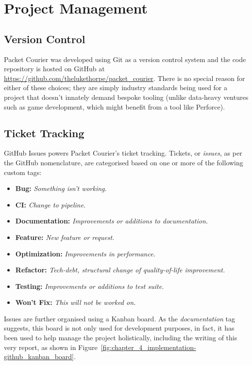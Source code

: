 \section{Project Management}

\subsection{Version Control}

Packet Courier was developed using Git\cite{git} as a version control system and the code repository is hosted on
GitHub\cite{github, packet_courier} at \url{https://github.com/thelukethorpe/packet_courier}. There is no special
reason for either of these choices; they are simply industry standards being used for a project that doesn't
innately demand bespoke tooling (unlike data-heavy ventures such as game development, which might benefit from a tool
like Perforce\cite{perforce, perforce_vs_git}).

\subsection{Ticket Tracking}

GitHub Issues\cite{github_issues} powers Packet Courier's ticket tracking. Tickets, or \emph{issues}, as per the
GitHub nomenclature, are categorised based on one or more of the following custom tags:
\begin{itemize}
    \item \textbf{Bug:} \emph{Something isn't working.}
    \item \textbf{CI:} \emph{Change to pipeline.}
    \item \textbf{Documentation:} \emph{Improvements or additions to documentation.}
    \item \textbf{Feature:} \emph{New feature or request.}
    \item \textbf{Optimization:} \emph{Improvements in performance.}
    \item \textbf{Refactor:} \emph{Tech-debt, structural change of quality-of-life improvement.}
    \item \textbf{Testing:} \emph{Improvements or additions to test suite.}
    \item \textbf{Won't Fix:} \emph{This will not be worked on.}
\end{itemize}

Issues are further organised using a Kanban board\cite{kanban_board}. As the \emph{documentation} tag suggests,
this board is not only used for development purposes, in fact, it has been used to help manage the project
holistically, including the writing of this very report, as shown in
Figure~\ref{fig:chapter_4_implementation-github_kanban_board}.


